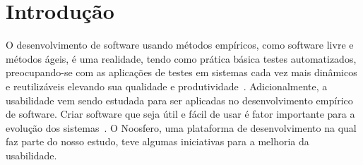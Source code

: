 \section{Introdução}
\label{introducao}

O desenvolvimento de software usando métodos empíricos, como software livre e métodos ágeis, é uma realidade, tendo como prática básica testes automatizados, preocupando-se com as aplicações de testes em sistemas cada vez mais dinâmicos e reutilizáveis elevando sua qualidade e produtividade~\cite{vicente2010}.
%
Adicionalmente, a usabilidade vem sendo estudada para ser aplicadas no desenvolvimento empírico de software. Criar software que seja útil e fácil de usar é fator importante para a evolução dos sistemas~\cite{santos2012}.
%
O Noosfero, uma plataforma de desenvolvimento na qual faz parte do nosso estudo, teve algumas iniciativas para a melhoria da usabilidade.
